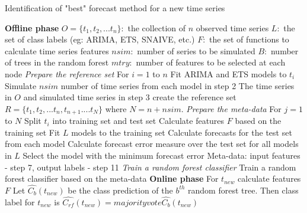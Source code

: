 \documentclass[11pt,a4paper,]{article}
\theoremstyle{definition}
\theoremstyle{definition}
\theoremstyle{definition}
\theoremstyle{remark}
\begin{document}
\begin{algorithm}
  \caption{Identification of "best" forecast method for a new time series}
  \label{alg:algo-lab}
  \begin{algorithmic}[1]
    \Statex \textbf{Offline phase}
    \Statex {}
    \Statex \hspace{1cm}$O=\{t_1, t_2, ...t_n\}:$ the collection of $n$ observed time series
      \Statex \hspace{1cm}$L:$ the set of class labels (eg: ARIMA, ETS, SNAIVE, etc.)
         \Statex \hspace{1cm}$F:$ the set of functions to calculate time series features
         \Statex \hspace{1cm}$nsim:$ number of series to be simulated
         \Statex \hspace{1cm}$B:$ number of trees in the random forest
         \Statex \hspace{1cm}$mtry:$ number of features to be selected at each node
     \Statex {}
      \Statex \hspace{1cm} 
      \Statex
     \Statex \textit{Prepare the reference set}
    \Statex For $i=1$ to $n$
    \State Fit ARIMA and ETS models to $t_i$
    \State Simulate $nsim$ number of time series from each model in step 2
    \State The time series in $O$ and simulated time series in step 3 create the reference set $R=\{t_1, t_2, ...t_n, t_{n+1}....t_N\}$ where $N = n + nsim$.
    \Statex 
    \Statex \textit{Prepare the meta-data}
    \Statex For $j=1$ to $N$
    \State Split $t_i$ into training set and test set
    \State Calculate features $F$ based on the training set 
    \State Fit $L$ models to the training set
    \State Calculate forecasts for the test set from each model
    \State Calculate forecast error measure over the test set for all models in $L$
    \State Select the model with the minimum forecast error
    \State Meta-data: input features - step 7, output labels - step 11
     \Statex
    \Statex \textit{Train a random forest classifier}
    \State Train a random forest classifier based on the meta-data
    \Statex
     \Statex \textbf{Online phase}
    \Statex {}
    \Statex \hspace{1cm} 
     \Statex {}
      \Statex \hspace{1cm} 
  \State For $t_{new}$ calculate features $F$
  \State Let $\hat{C_b}(t_{new})$ be the class prediction of the $b^{th}$ random forest tree. Then class label for $t_{new}$ is $\hat{C_{rf}}(t_{new})=majorityvote{\hat{C_b}(t_{new})}$
   \end{algorithmic}
\end{algorithm}
\end{document}
